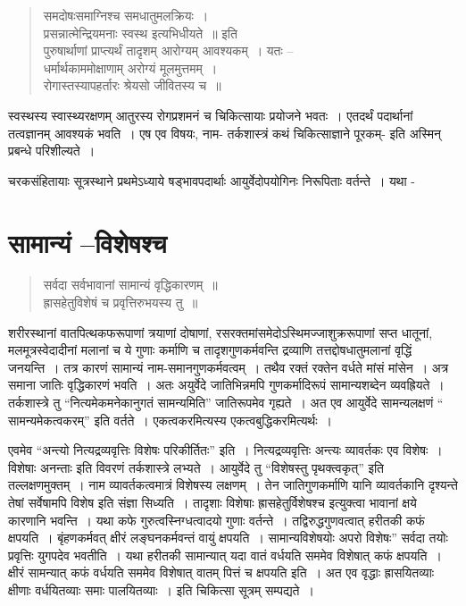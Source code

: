 {\begin{verse}
समदोषःसमाग्निश्च समधातुमलक्रियः~। \\
प्रसन्नात्मेन्द्रियमनाः स्वस्थ इत्यभिधीयते~॥ इति\\
पुरुषार्थाणां प्राप्त्यर्थं तादृशम् आरोग्यम् आवश्यकम्~। यतः –\\
धर्मार्थकाममोक्षाणाम् अरोग्यं मूलमुत्तमम्~। \\
रोगास्तस्यापहर्तारः श्रेयसो जीवितस्य च~॥ 
\end{verse}
स्वस्थस्य स्वास्थ्यरक्षणम् आतुरस्य रोगप्रशमनं च चिकित्सायाः प्रयोजने भवतः~। एतदर्थं पदार्थानां तत्वज्ञानम् आवश्यकं भवति~। एष एव विषयः, नाम- तर्कशास्त्रं कथं चिकित्साज्ञाने पूरकम्- इति अस्मिन् प्रबन्धे परिशील्यते~। 

चरकसंहितायाः सूत्रस्थाने प्रथमेऽध्याये षड्भावपदार्थाः आयुर्वेदोपयोगिनः निरूपिताः वर्तन्ते~। यथा -

\section*{सामान्यं –विशेषश्च}

\begin{verse}
सर्वदा सर्वभावानां सामान्यं वृद्धिकारणम्~॥\\
ह्रासहेतुविशेषं च प्रवृत्तिरुभयस्य तु~॥
\end{verse}

शरीरस्थानां वातपित्थकफरूपाणां त्रयाणां दोषाणां, रसरक्तमांसमेदोऽस्थिमज्जाशुक्र\-रूपाणां सप्त धातूनां, मलमूत्रस्वेदादीनां मलानां च ये गुणाः कर्माणि च तादृशगुणकर्मवन्ति द्रव्याणि तत्तद्दोषधातुमलानां वृद्धिं जनयन्ति~। तत्र कारणं सामान्यं नाम-समानगुणकर्मवत्वम्~। तथैव रक्तं रक्तेन वर्धते मांसं मांसेन~। अत्र समाना जातिः वृद्धिकारणं भवति~। अतः अयुर्वेदे जातिभिन्नमपि गुणकर्मादिरूपं सामान्यशब्देन व्यवह्रियते~। तर्कशास्त्रे तु “नित्यमेकमनेकानुगतं सामन्यमिति” जातिरूपमेव गृह्यते~। अत एव आयुर्वेदे सामन्यलक्षणं “ सामन्यमेकत्वकरम्” इति वर्तते~। एकत्वकरमित्यस्य एकत्वबुद्धिकरमित्यर्थः~। 

एवमेव “अन्त्यो नित्यद्रव्यवृत्तिः विशेषः परिकीर्तितः” इति~। नित्यद्रव्यवृत्तिः अन्त्यः व्यावर्तकः एव विशेषः~। विशेषाः अनन्ताः इति विवरणं तर्कशास्त्रे लभ्यते~। आयुर्वेदे तु “विशेषस्तु पृथक्त्वकृत्” इति तल्लक्षणमुक्तम्~। नाम व्यावर्तकत्वमात्रं विशेषस्य लक्षणम्~। तेन जातिगुणकर्माणि यानि व्यावर्तकानि दृश्यन्ते तेषां सर्वेषामपि विशेष इति संज्ञा सिध्यति~। तादृशाः विशेषाः ह्रासहेतुर्विशेषश्च इत्युक्त्वा भावानां क्षये कारणानि भवन्ति~। यथा कफे गुरुत्वस्निग्धत्वादयो गुणाः वर्तन्ते~। तद्विरुद्धगुणवत्वात् हरीतकी कफं क्षपयति~। बृंहणकर्मवत् क्षीरं लङ्घनकर्मवन्तं वायुं क्षपयति~। सामान्यविशेषयोः अपरो विशेषः” सर्वदा तयोः प्रवृत्तिः युगपदेव भवतीति~। यथा हरीतकी सामान्यात् यदा वातं वर्धयति सममेव विशेषात् कफं क्षपयति~। क्षीरं सामन्यात् कफं वर्धयति सममेव विशेषात् वातम् पित्तं च क्षपयति इति~। अत एव वृद्धाः ह्रासयितव्याः क्षीणाः वर्धयितव्याः समाः पालयितव्याः~। इति चिकित्सा सूत्रम् सम्पद्यते~। 

}
